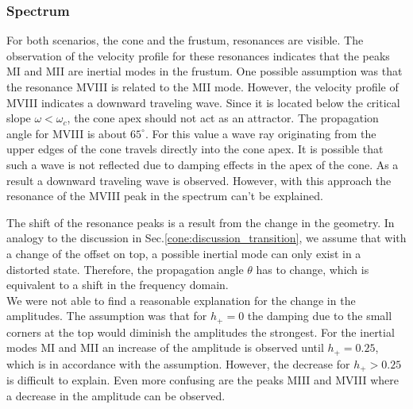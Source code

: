 \subsubsection{Spectrum}

For both scenarios, the cone and the frustum, resonances are visible.
The observation of the velocity profile for these resonances indicates
that the peaks M\RN{1} and M\RN{2} are inertial modes in the frustum.
One possible assumption was that the resonance M\RN{8} is related to the M\RN{2} mode.
However, the velocity profile of M\RN{8} indicates a downward traveling wave.
Since it is located below the critical slope $\omega < \omega_c$, the cone apex
should not act as an attractor.
The propagation angle for M\RN{8} is about $65^\circ$.
For this value a wave ray originating from the upper edges of the cone travels directly
into the cone apex.
It is possible that such a wave is not reflected due to damping effects in
the apex of the cone. As a result a downward traveling wave is observed.
However, with this approach the resonance of the M\RN{8} peak
in the spectrum can't be explained.

The shift of the resonance peaks is a result from the change in the geometry.
In analogy to the discussion in Sec.\ref{cone:discussion_transition},
 we assume that with a change of the offset on top,
a possible inertial mode can only exist in a distorted state.
Therefore, the propagation angle $\theta$ has to change,
which is equivalent to a shift in the frequency domain.\\
We were not able to find a reasonable explanation for the change in the amplitudes.
The assumption was that for $h_+=0$ the damping due to the small corners at the top
would diminish the amplitudes the strongest.
For the inertial modes M\RN{1} and M\RN{2} an increase of the amplitude is observed until $h_+=0.25$,
which is in accordance with the assumption.
However, the decrease for $h_+>0.25$ is difficult to explain.
Even more confusing are  the peaks M\RN{3} and M\RN{8} where a decrease in the amplitude
can be observed.

